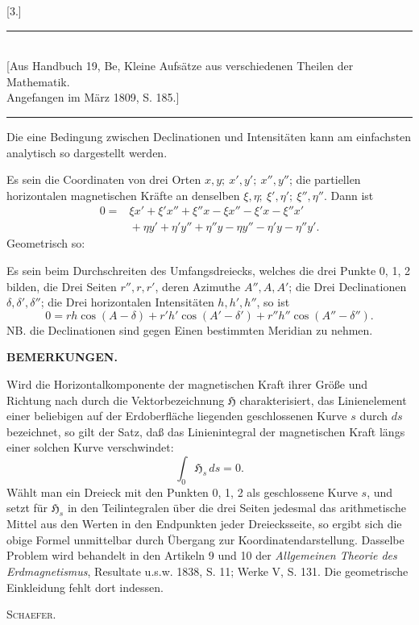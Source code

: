 \clearpage\begingroup{}
\begin{center}
[3.]\par\medskip\rule{.86\textwidth}{.35pt}\\
{\small [Aus Handbuch 19, Be, Kleine Aufsätze aus verschiedenen Theilen der Mathematik.\\
Angefangen im März 1809, S. 185.]}\\
\rule{.86\textwidth}{.35pt}
\end{center}
\noindent\hspace*{\parindent}Die eine Bedingung zwischen Declinationen und Intensitäten kann am
einfachsten analytisch so dargestellt werden.

Es sein die Coordinaten von drei Orten \(x,y;\ x',y';\ x'',y''\); die partiellen
horizontalen magnetischen Kräfte an denselben \(\xi,\eta;\ \xi',\eta';\ \xi'',\eta''\). Dann ist
\[
\begin{aligned}
0={}&\xi x'+\xi'x''+\xi''x-\xi x''-\xi'x-\xi''x'\\
&{}+\eta y'+\eta'y''+\eta''y-\eta y''-\eta'y-\eta''y'.
\end{aligned}
\]
\noindent Geometrisch so:
\par\indent Es sein beim Durchschreiten des Umfangsdreiecks, welches die drei
Punkte 0, 1, 2 bilden, die Drei Seiten \(r'',r,r'\), deren Azimuthe \(A'',A,A'\); die
Drei Declinationen \(\delta,\delta',\delta''\); die Drei horizontalen Intensitäten \(h,h',h''\), so ist
\[
0=rh\cos(A-\delta)+r'h'\cos(A'-\delta')+r''h''\cos(A''-\delta'').
\]
\noindent NB. die Declinationen sind gegen Einen bestimmten Meridian zu nehmen.
\bigskip\begin{center}\textbf{BEMERKUNGEN.}\end{center}
{\small\noindent\hspace*{\parindent}Wird die Horizontalkomponente der magnetischen Kraft ihrer Größe und Richtung nach durch die
Vektorbezeichnung \(\mathfrak H\) charakterisiert, das Linienelement einer beliebigen auf der Erdoberfläche liegenden
geschlossenen Kurve \(s\) durch \(ds\) bezeichnet, so gilt der Satz, daß das Linienintegral der magnetischen Kraft
längs einer solchen Kurve verschwindet:
\[\int_0\mathfrak H_s\,ds=0.\]
\clearpage{}
\noindent Wählt man ein Dreieck mit den Punkten 0, 1, 2 als geschlossene Kurve \(s\), und setzt für \(\mathfrak H_s\) in den Teilintegralen
über die drei Seiten jedesmal das arithmetische Mittel aus den Werten in den Endpunkten jeder
Dreiecksseite, so ergibt sich die obige Formel unmittelbar durch Übergang zur Koordinatendarstellung.
Dasselbe Problem wird behandelt in den Artikeln 9 und 10 der \textit{Allgemeinen Theorie des Erdmagnetismus},
Resultate u.s.w. 1838, S. 11; Werke V, S. 131. Die geometrische Einkleidung fehlt dort indessen.
\par\raggedleft\textsc{Schaefer}.\par}
\clearpage\endgroup
